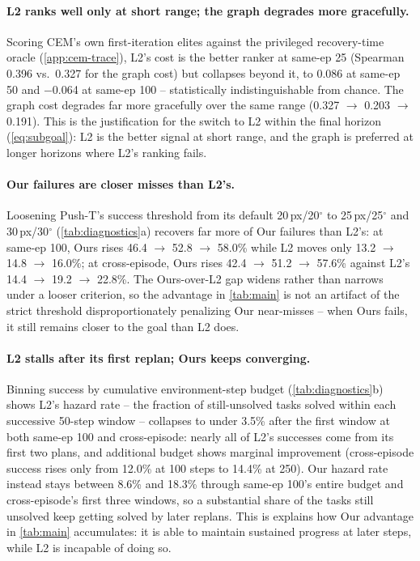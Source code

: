\documentclass{article} %
\begin{document}
\paragraph{L2 ranks well only at short range; the graph degrades more gracefully.} Scoring
CEM's own first-iteration elites against the privileged recovery-time oracle
(\cref{app:cem-trace}), L2's cost is the better ranker at same-ep 25 (Spearman 0.396 vs.\ 0.327
for the graph cost) but collapses beyond it, to 0.086 at same-ep 50 and $-$0.064 at same-ep 100 --
statistically indistinguishable from chance. The graph cost degrades far more gracefully over the
same range (0.327 $\to$ 0.203 $\to$ 0.191). This is the justification for the switch to L2 within the final horizon
(\cref{eq:subgoal}): L2 is the better signal at short range, and the graph is preferred at longer horizons where L2's ranking fails.

\paragraph{Our failures are closer misses than L2's.} Loosening Push-T's success threshold
from its default 20\,px/20$^\circ$ to 25\,px/25$^\circ$ and 30\,px/30$^\circ$
(\cref{tab:diagnostics}a) recovers far more of Our failures than L2's: at same-ep 100, Ours rises 46.4 $\to$ 52.8 $\to$ 58.0\% while L2 moves only 13.2 $\to$ 14.8 $\to$ 16.0\%; at
cross-episode, Ours rises 42.4 $\to$ 51.2 $\to$ 57.6\% against L2's 14.4 $\to$ 19.2 $\to$
22.8\%. The Ours-over-L2 gap widens rather than narrows under a looser criterion, so the
advantage in \cref{tab:main} is not an artifact of the strict threshold disproportionately
penalizing Our near-misses -- when Ours fails, it still remains closer to the goal than L2 does.

\paragraph{L2 stalls after its first replan; Ours keeps converging.} Binning success by
cumulative environment-step budget (\cref{tab:diagnostics}b) shows L2's hazard rate -- the
fraction of still-unsolved tasks solved within each successive 50-step window -- collapses to
under 3.5\% after the first window at both same-ep 100 and cross-episode: nearly all of L2's
successes come from its first two plans, and additional budget shows marginal improvement
(cross-episode success rises only from 12.0\% at 100 steps to 14.4\% at 250).
Our hazard rate instead stays between 8.6\% and 18.3\% through same-ep 100's entire budget and
cross-episode's first three windows, so a substantial share of the tasks still unsolved keep
getting solved by later replans. This is explains how Our advantage in \cref{tab:main}
accumulates: it is able to maintain sustained progress at later steps, while L2 is incapable of doing so.
\end{document}
